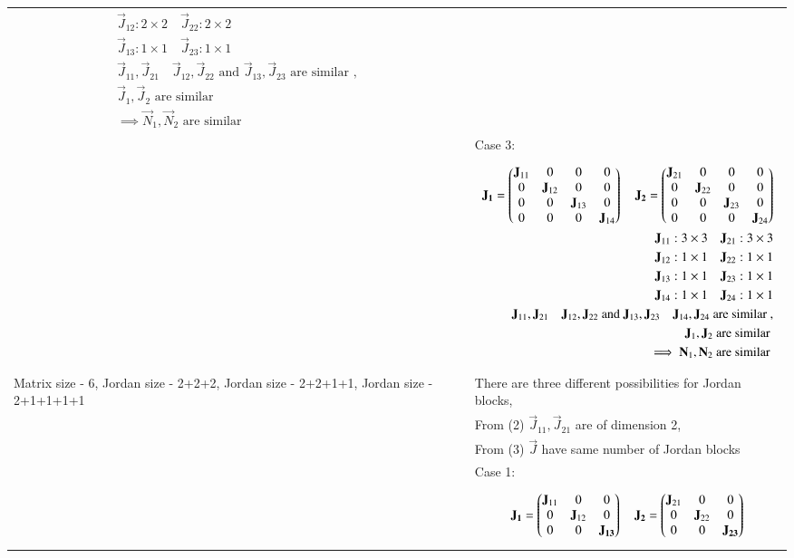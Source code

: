 \begin{longtable}{|p{5cm}|p{13cm}|}
{\begin{align*}
    \vec{J}_{12}: 2\times2 \quad \vec{J}_{22}: 2\times2\\
    \vec{J}_{13}: 1\times1 \quad \vec{J}_{23}: 1\times1\\
    \vec{J}_{11}, \vec{J}_{21}\quad \vec{J}_{12}, \vec{J}_{22}  \text{ and } \vec{J}_{13}, \vec{J}_{23} \text{ are similar }, \\
    \vec{J}_{1}, \vec{J}_{2} \text{ are similar }\\
    \implies \vec{N}_{1}, \vec{N}_{2} \text{ are similar }
\end{align*}}
\\& Case 3: 
\\&
\parbox{12cm}{\begin{align*}
    \mathbf{J_1}=\begin{pmatrix}\mathbf{J}_{11} & 0&0&0 \\ 0&\mathbf{J}_{12}&0&0\\0&0&\mathbf{J}_{13}&0\\0&0&0&\mathbf{J}_{14}\end{pmatrix} \quad \mathbf{J_2}=\begin{pmatrix}\mathbf{J}_{21} & 0&0&0 \\ 0&\mathbf{J}_{22}&0&0\\0&0&\mathbf{J}_{23}&0\\0&0&0&\mathbf{J}_{24}\end{pmatrix}\\
    \mathbf{J}_{11}: 3\times3 \quad \mathbf{J}_{21}: 3\times3\\
    \mathbf{J}_{12}: 1\times1 \quad \mathbf{J}_{22}: 1\times1\\
    \mathbf{J}_{13}: 1\times1 \quad \mathbf{J}_{23}: 1\times1\\
    \mathbf{J}_{14}: 1\times1 \quad \mathbf{J}_{24}: 1\times1\\
    \mathbf{J}_{11}, \mathbf{J}_{21}\quad \mathbf{J}_{12}, \mathbf{J}_{22}  \text{ and } \mathbf{J}_{13}, \mathbf{J}_{23} \quad \mathbf{J}_{14}, \mathbf{J}_{24} \text{ are similar }, \\
    \mathbf{J}_{1}, \mathbf{J}_{2} \text{ are similar }\\
    \implies \mathbf{N}_{1}, \mathbf{N}_{2} \text{ are similar }
\end{align*}}\\
\hline
Matrix size - 6, Jordan size - 2+2+2, Jordan size - 2+2+1+1, Jordan size - 2+1+1+1+1  & There are three different possibilities for Jordan blocks,
\\& From (2) $\vec{J}_{11}, \vec{J}_{21} $ are of dimension 2, \\& From (3) $\vec{J}$ have same number of Jordan blocks
\\& Case 1: 
\\&
\parbox{12cm}{\begin{align*}
    \vec{J_1}=\myvec{\vec{J}_{11} & 0&0\\ 0&\vec{J}_{12}&0 \\ 0&0&\vec{J_{13}}} \quad \vec{J_2}=\myvec{\vec{J}_{21} & 0&0\\ 0&\vec{J}_{22}&0 \\ 0&0&\vec{J_{23}}}\\

\end{align*}}
\end{longtable}
